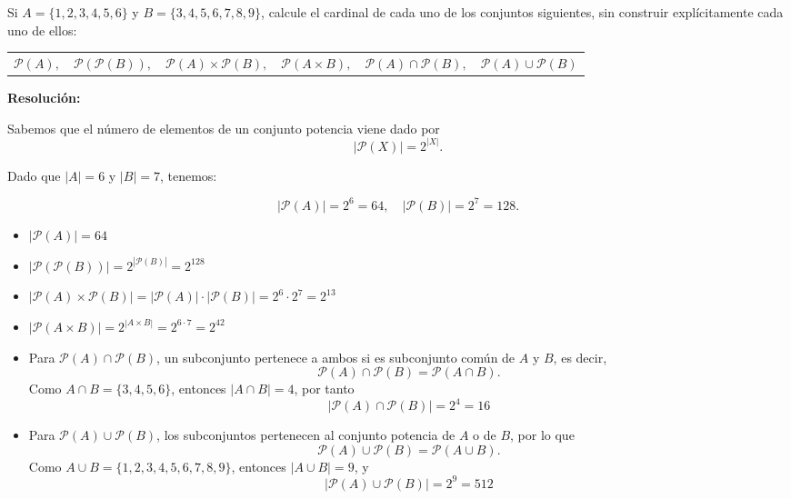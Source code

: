 \documentclass[a4paper,12pt]{article}
\begin{document}
\begin{ejercicio}[title=Ejercicio 1]
Si $A = \{1,2,3,4,5,6\}$ y $B=\{3,4,5,6,7,8,9\}$, calcule el cardinal de cada uno de los conjuntos siguientes, sin construir explícitamente cada uno de ellos:

\vspace{0.5em}
\begin{tabular}{cccccc}
$\mathcal{P}(A),$ &
$\mathcal{P}(\mathcal{P}(B)),$ &
$\mathcal{P}(A) \times \mathcal{P}(B),$ &
$\mathcal{P}(A \times B),$ &
$\mathcal{P}(A) \cap \mathcal{P}(B),$ &
$\mathcal{P}(A) \cup \mathcal{P}(B)$
\end{tabular}

\tcblower
\textbf{Resolución:}

Sabemos que el número de elementos de un conjunto potencia viene dado por  
\[
|\mathcal{P}(X)| = 2^{|X|}.
\]

Dado que $|A| = 6$ y $|B| = 7$, tenemos:

\[
|\mathcal{P}(A)| = 2^{6} = 64, \quad
|\mathcal{P}(B)| = 2^{7} = 128.
\]

\begin{itemize}
\item $|\mathcal{P}(A)| = \boxed{64}$

\item $|\mathcal{P}(\mathcal{P}(B))| = 2^{|\mathcal{P}(B)|} = \boxed{2^{128}}$

\item $|\mathcal{P}(A) \times \mathcal{P}(B)| = |\mathcal{P}(A)| \cdot |\mathcal{P}(B)| = 2^6 \cdot 2^7 = \boxed{2^{13}}$

\item $|\mathcal{P}(A \times B)| = 2^{|A \times B|} = 2^{6 \cdot 7} = \boxed{2^{42}}$

\item Para $\mathcal{P}(A) \cap \mathcal{P}(B)$, un subconjunto pertenece a ambos si es subconjunto común de $A$ y $B$, es decir,  
\[
\mathcal{P}(A) \cap \mathcal{P}(B) = \mathcal{P}(A \cap B).
\]
Como $A \cap B = \{3,4,5,6\}$, entonces $|A \cap B| = 4$, por tanto  
\[
|\mathcal{P}(A) \cap \mathcal{P}(B)| = 2^{4} = \boxed{16}
\]

\item Para $\mathcal{P}(A) \cup \mathcal{P}(B)$, los subconjuntos pertenecen al conjunto potencia de $A$ o de $B$, por lo que  
\[
\mathcal{P}(A) \cup \mathcal{P}(B) = \mathcal{P}(A \cup B).
\]
Como $A \cup B = \{1,2,3,4,5,6,7,8,9\}$, entonces $|A \cup B| = 9$, y  
\[
|\mathcal{P}(A) \cup \mathcal{P}(B)| = 2^{9} = \boxed{512}
\]
\end{itemize}

\end{ejercicio}
\end{document}

